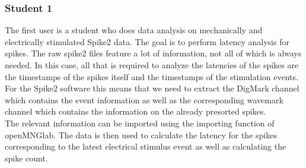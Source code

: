 \subsubsection{Student 1}

The first user is a student who does data analysis on mechanically and electrically stimulated Spike2 data. The goal is to perform latency analysis for spikes.  The raw spike2 files feature a lot of information, not all of which is always needed. In this case, all that is required to analyze the latencies of the spikes are the timestamps of the spikes itself and the timestamps of the stimulation events. For the Spike2 software this means that we need to extract the DigMark channel which contains the event information as well as the corresponding wavemark channel which contains the information on the already presorted spikes.\\
The relevant information can be imported using the importing function of openMNGlab. 
The data is then used to calculate the latency for the spikes corresponding to the latest electrical stimulus event as well as calculating the spike count.

